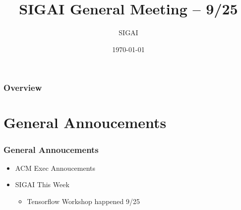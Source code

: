 \documentclass{beamer}
\title[9/25]{SIGAI General Meeting -- 9/25} %
\author{SIGAI} %
\institute[http://sigai.ml] %
{
  \textit{http://sigai.ml} %
}
\date{\today} %
\begin{document}
\begin{frame}
  \titlepage %
\end{frame}

\begin{frame}
  \frametitle{Overview} %
  \tableofcontents %
\end{frame}

\section{General Annoucements}
\begin{frame}
  \frametitle{General Annoucements}
  \begin{itemize}
  \item ACM Exec Annoucements
  \item SIGAI This Week
    \begin{itemize}
    \item Tensorflow Workshop happened 9/25
    \end{itemize}
  \end{itemize}
\end{frame}
\end{document}
